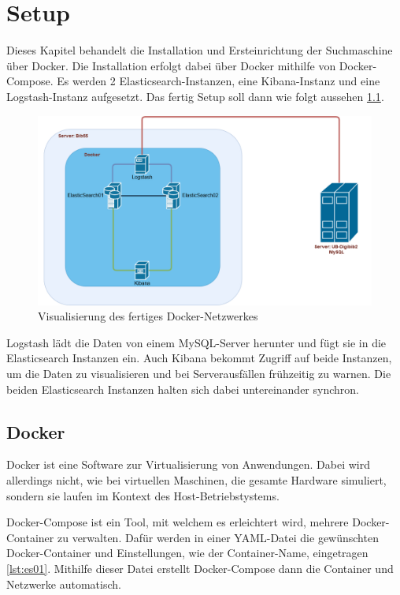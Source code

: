 \chapter{Setup}

Dieses Kapitel behandelt die Installation und Ersteinrichtung der Suchmaschine über Docker. Die Installation erfolgt dabei über Docker mithilfe von Docker-Compose. Es werden 2 Elasticsearch-Instanzen, eine Kibana-Instanz und eine Logstash-Instanz aufgesetzt. Das fertig Setup soll dann wie folgt aussehen \ref{img:dockerNetwork}.

\begin{figure}
	\centering
	\includegraphics[width=1\linewidth]{images/docker_structure.png}
	\caption{Visualisierung des fertiges Docker-Netzwerkes}
	\label{img:dockerNetwork}
\end{figure}

Logstash lädt die Daten von einem MySQL-Server herunter und fügt sie in die Elasticsearch Instanzen ein. Auch Kibana bekommt Zugriff auf beide Instanzen, um die Daten zu visualisieren und bei Serverausfällen frühzeitig zu warnen. Die beiden Elasticsearch Instanzen halten sich dabei untereinander synchron. 

\section{Docker}

Docker ist eine Software zur Virtualisierung von Anwendungen. Dabei wird allerdings nicht, wie bei virtuellen Maschinen, die gesamte Hardware simuliert, sondern sie laufen im Kontext des Host-Betriebstystems.

Docker-Compose ist ein Tool, mit welchem es erleichtert wird, mehrere Docker-Container zu verwalten. Dafür werden in einer YAML-Datei die gewünschten Docker-Container und Einstellungen, wie der Container-Name, eingetragen \ref{lst:es01}. Mithilfe dieser Datei erstellt Docker-Compose dann die Container und Netzwerke automatisch.

